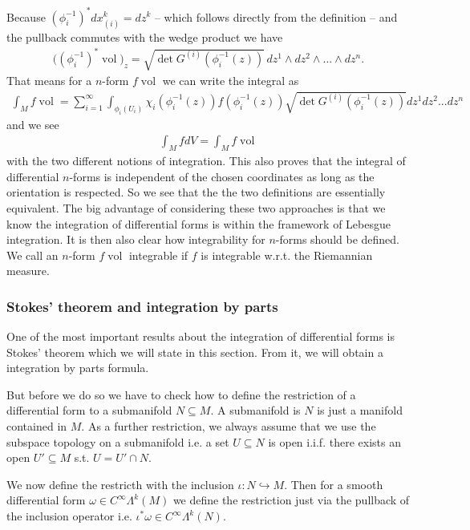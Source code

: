 \documentclass[12pt,a4paper]{article}
\numberwithin{equation}{subsection}
\numberwithin{lemma}{subsection}
\theoremstyle{definition}
\DeclareMathOperator{\vol}{vol}
\begin{document}
Because $(\phi_i^{-1})^* dx_{(i)}^k = dz^k$ -- which follows directly from the 
definition -- and the pullback commutes with the wedge product we have
\begin{align*}
    \big( (\phi_i^{-1})^* \vol)_z =  
        \sqrt{ \det G^{(i)}(\phi_i^{-1}(z))} \,
        dz^1 \wedge dz^2 \wedge ... \wedge dz^n.
\end{align*}
That means for a $n$-form $f \vol$ we can write the integral as
\begin{align*}
    \int_M f \vol = \sum_{i=1}^\infty \int_{\phi_i(U_i)} 
    \chi_i(\phi_i^{-1}(z)) f(\phi_i^{-1}(z))
        \sqrt{ \det G^{(i)}(\phi_i^{-1}(z))} dz^1 dz^2 ... dz^n
\end{align*} 
and we see 
\begin{align*}
    \int_M f dV = \int_M f \vol
\end{align*}
with the two different notions of integration. This also proves that 
the integral of differential $n$-forms is independent of the chosen 
coordinates as long as the orientation is respected. So we see that the
the two definitions are essentially equivalent.
The big advantage of considering these two
approaches is that we know the integration of 
differential forms is within the framework of Lebesgue integration. 
It is then also 
clear how integrability for $n$-forms should be defined. We call an 
$n$-form $f \vol$ integrable if $f$ is integrable w.r.t. the Riemannian measure.

\subsubsection{Stokes' theorem and integration by parts} 

One of the most important results about the integration of differential forms
is Stokes' theorem which we will state in this section. From it, we will 
obtain a integration by parts formula.

But before we do so we have to check how to define the restriction of a
differential form to a submanifold $N \subseteq M$. A submanifold is $N$ 
is just a manifold contained in $M$. As a further restriction, we always assume
that we use the subspace topology on a submanifold i.e. a set $U \subseteq N$ 
is open i.i.f. there exists an open $U' \subseteq M$ s.t. $U = U' \cap N$.

We now define the restricth with the inclusion $\iota: N \hookrightarrow M$. Then for a 
smooth differential form $\omega \in C^\infty \Lambda^k (M)$ we define 
the restriction just via the pullback of the inclusion operator i.e. 
$\iota^* \omega \in C^\infty \Lambda^k(N)$. 
\end{document}
